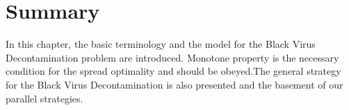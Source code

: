 \color{blue}
\section{Summary}
In this chapter, the basic terminology and the model for the Black Virus Decontamination problem are introduced. Monotone property is the necessary condition for the spread optimality and should be obeyed.The general strategy for the Black Virus Decontamination is also presented and the basement of our parallel strategies.

\color{black}




 



